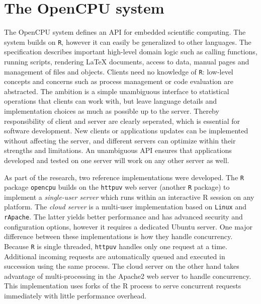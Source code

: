 \documentclass{article}
\newcommand{\R}{\texttt{R}\xspace}
\begin{document}









\section{The OpenCPU system}

The OpenCPU system defines an API for embedded scientific computing. The system builds on \R, however it can easily be generalized to other languages. The specification describes important high-level domain logic such as calling functions, running scripts, rendering \LaTeX \xspace documents, access to data, manual pages and  management of files and objects. Clients need no knowledge of \R: low-level concepts and concerns such as process management or code evaluation are abstracted. The ambition is a simple unambiguous interface to statistical operations that clients can work with, but leave language details and implementation choices as much as possible up to the server. Thereby responsibility of client and server are clearly seperated, which is essential for software development. New clients or applications updates can be implemented without affecting the server, and different servers can optimize within their strengths and limitations. An unambiguous API ensures that applications developed and tested on one server will work on any other server as well. 

As part of the research, two reference implementations were developed. The \R package \texttt{opencpu} builds on the \texttt{httpuv} web server (another \R package) to implement a \emph{single-user server} which runs within an interactive R session on any platform. The \emph{cloud server} is a multi-user implementation based on \texttt{Linux} and \texttt{rApache}. The latter yields better performance and has advanced security and configuration options, however it requires a dedicated Ubuntu server. One major difference between these implementations is how they handle concurrency. Because \R is single threaded, \texttt{httpuv} handles only one request at a time. Additional incoming requests are automatically queued and executed in succession using the same process. The cloud server on the other hand takes advantage of multi-processing in the Apache2 web server to handle concurrency. This implementation uses forks of the R process to serve concurrent requests immediately with little performance overhead. 
\end{document}
